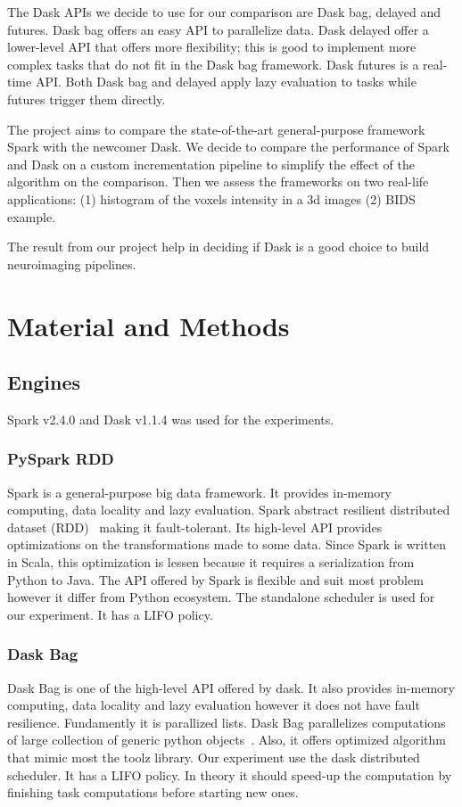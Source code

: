 \documentclass[conference]{IEEEtran}
\begin{document}
The Dask APIs we decide to use for our comparison are Dask bag, delayed and futures.
Dask bag offers an easy API to parallelize data. Dask delayed offer a lower-level API
that offers more flexibility; this is good to implement more complex tasks that do
not fit in the Dask bag framework. Dask futures is a real-time API. Both Dask bag and
delayed apply lazy evaluation to tasks while futures trigger them directly.

The project aims to compare the state-of-the-art general-purpose framework Spark with
the newcomer Dask. We decide to compare the performance of Spark and Dask on a custom
incrementation pipeline to simplify the effect of the algorithm on the comparison.
Then we assess the frameworks on two real-life applications: (1) histogram of the
voxels intensity in a 3d images (2) BIDS example.

The result from our project help in deciding if Dask is a good choice to build
neuroimaging pipelines.


\section{Material and Methods}

\subsection{Engines}
Spark v2.4.0 and Dask v1.1.4 was used for the experiments.

\subsubsection{PySpark RDD~\cite{spark-rdd}} Spark is a general-purpose big data
framework. It provides in-memory computing, data locality and lazy evaluation. Spark
abstract resilient distributed dataset (RDD)~\cite{RDD} making it fault-tolerant. Its
high-level API provides optimizations on the transformations made to some data. Since
Spark is written in Scala, this optimization is lessen because it requires a
serialization from Python to Java. The API offered by Spark is flexible and suit most
problem however it differ from Python ecosystem. The standalone scheduler is used for
our experiment. It has a LIFO policy.

\subsubsection{Dask Bag~\cite{dask-bag}} Dask Bag is one of the high-level API
offered by dask. It also provides in-memory computing, data locality and lazy
evaluation however it does not have fault resilience. Fundamently it is parallized
lists. Dask Bag parallelizes computations of large collection of generic python
objects~\cite{dask-bag}. Also, it offers optimized algorithm that mimic most the
toolz library. Our experiment use the dask distributed~\cite{dask-distributed}
scheduler. It has a LIFO policy. In theory it should speed-up the computation by
finishing task computations before starting new ones.
\end{document}
